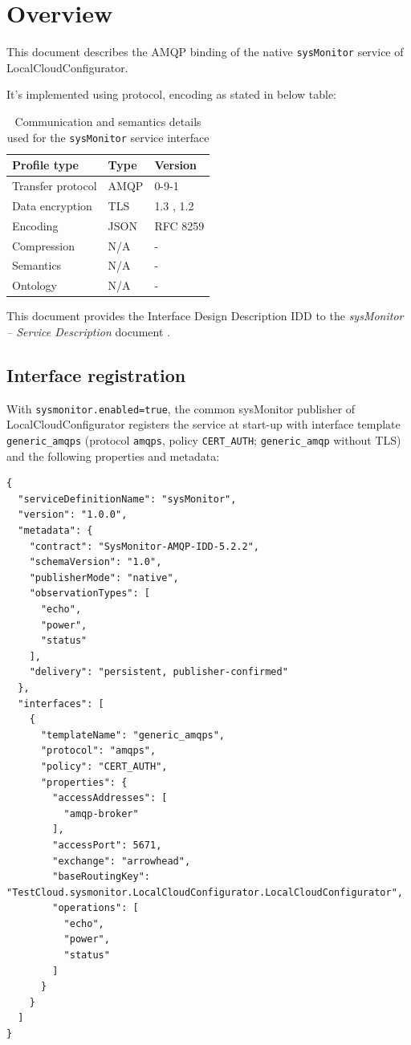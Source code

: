 \documentclass[a4paper]{arrowhead}
\begin{document}
\section{Overview}
\label{sec:overview}

This document describes the AMQP binding of the native \texttt{sysMonitor} service of LocalCloudConfigurator.

It's implemented using protocol, encoding as stated in below table:
\begin{table}[ht!]
  \centering
  \begin{tabular}{|l|l|l|}
    \hline
    \rowcolor{gray!33} Profile type & Type & Version \\ \hline
    Transfer protocol & AMQP & 0-9-1 \cite{amqp091} \\ \hline
    Data encryption & TLS & 1.3 \cite{rfc8446}, 1.2 \cite{rfc5246} \\ \hline
    Encoding & JSON & RFC 8259 \cite{rfc8259} \\ \hline
    Compression & N/A & - \\ \hline
    Semantics & N/A & - \\ \hline
    Ontology & N/A & - \\ \hline
  \end{tabular}
  \caption{Communication and semantics details used for the \texttt{sysMonitor} service interface}
  \label{tab:comunication_semantics_profile}
\end{table}

This document provides the Interface Design Description IDD to the \textit{sysMonitor -- Service Description} document \cite{lcc-sysMonitor-sd}.

\subsection{Interface registration}

With \texttt{sysmonitor.enabled=true}, the common sysMonitor publisher of LocalCloudConfigurator registers the service at start-up with interface template \texttt{generic\_\allowbreak{}amqps} (protocol \texttt{amqps}, policy \texttt{CERT\_\allowbreak{}AUTH}; \texttt{generic\_\allowbreak{}amqp} without TLS) and the following properties and metadata:

\begin{lstlisting}[caption={Registered service instance (TestCloud).}]
{
  "serviceDefinitionName": "sysMonitor",
  "version": "1.0.0",
  "metadata": {
    "contract": "SysMonitor-AMQP-IDD-5.2.2",
    "schemaVersion": "1.0",
    "publisherMode": "native",
    "observationTypes": [
      "echo",
      "power",
      "status"
    ],
    "delivery": "persistent, publisher-confirmed"
  },
  "interfaces": [
    {
      "templateName": "generic_amqps",
      "protocol": "amqps",
      "policy": "CERT_AUTH",
      "properties": {
        "accessAddresses": [
          "amqp-broker"
        ],
        "accessPort": 5671,
        "exchange": "arrowhead",
        "baseRoutingKey": "TestCloud.sysmonitor.LocalCloudConfigurator.LocalCloudConfigurator",
        "operations": [
          "echo",
          "power",
          "status"
        ]
      }
    }
  ]
}
\end{lstlisting}
\end{document}
